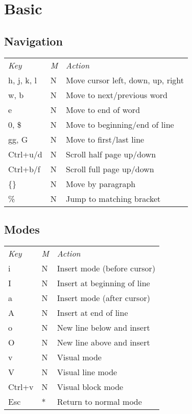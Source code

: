 \section{Basic}

\subsection{Navigation}
	\begin{tabularx}{\tablewidth}{llX}
		\emph{Key} & \emph{M} & \emph{Action} \\
		h, j, k, l & N & Move cursor left, down, up, right \\
		w, b       & N & Move to next/previous word \\
		e          & N & Move to end of word \\
		0, \$      & N & Move to beginning/end of line \\
		gg, G      & N & Move to first/last line \\
		Ctrl+u/d   & N & Scroll half page up/down \\
		Ctrl+b/f   & N & Scroll full page up/down \\
		\{\}       & N & Move by paragraph \\
		\%         & N & Jump to matching bracket \\
	\end{tabularx}

\subsection{Modes}
	\begin{tabularx}{\tablewidth}{llX}
		\emph{Key} & \emph{M} & \emph{Action} \\
		i          & N & Insert mode (before cursor) \\
		I          & N & Insert at beginning of line \\
		a          & N & Insert mode (after cursor) \\
		A          & N & Insert at end of line \\
		o          & N & New line below and insert \\
		O          & N & New line above and insert \\
		v          & N & Visual mode \\
		V          & N & Visual line mode \\
		Ctrl+v     & N & Visual block mode \\
		Esc        & * & Return to normal mode \\
	\end{tabularx}

